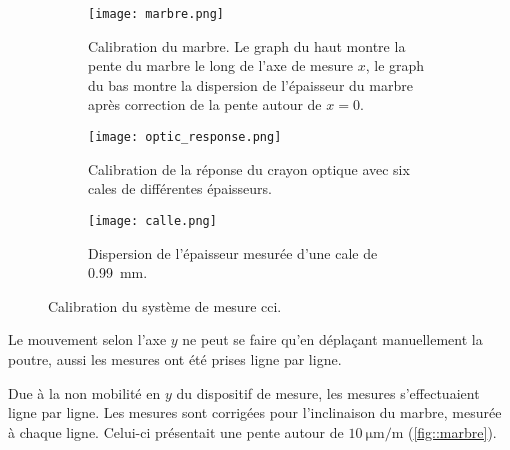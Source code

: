                     \begin{figure}[htpb]
                        \begin{minipage}{0.56\textwidth}
                           \begin{subfigure}[t]{\textwidth} \texttt{[image: marbre.png]}
                            \caption[Calibration du marbre.]{Calibration du marbre. Le graph du haut montre la pente du marbre le long de l'axe de mesure $x$, le graph du bas montre la dispersion de l'épaisseur du marbre après correction de la pente autour de $x=0$.}
                            \label{fig::marbre}
                            \end{subfigure}
                        \end{minipage}
                        \hfill
                        \begin{minipage}{0.38\textwidth}
                            \begin{subfigure}[t]{\textwidth}
                                \texttt{[image: optic\_response.png]}
                                \caption[Calibration de la réponse du crayon optique.]{Calibration de la réponse du crayon optique avec six cales de différentes épaisseurs.}
                                \label{fig::optic_response}
                            \end{subfigure}
                            \begin{subfigure}[t]{\textwidth}
                                \texttt{[image: calle.png]}
                                \caption[Dispersion de l'épaisseur mesurée d'une cale de \SI{0.99}{\milli\meter}.]{Dispersion de l'épaisseur mesurée d'une cale de \SI{0.99}{\milli\meter}.}
                                \label{fig::calle}
                            \end{subfigure}
                        \end{minipage}
                        \caption[Calibration du système de mesure \gls{cci}.]{Calibration du système de mesure \gls{cci}.}
                        \label{fig::calibration}
                    \end{figure}
                    Le mouvement selon l'axe $y$ ne peut se faire qu'en déplaçant manuellement la poutre, aussi les mesures ont été prises ligne par ligne.
                    
                    Due à la non mobilité en $y$ du dispositif de mesure, les mesures s'effectuaient ligne par ligne. Les mesures sont corrigées pour l'inclinaison du marbre, mesurée à chaque ligne. Celui-ci présentait une pente autour de $\SI{10}{\micro\meter\per\meter}$ (\autoref{fig::marbre}).
                    
